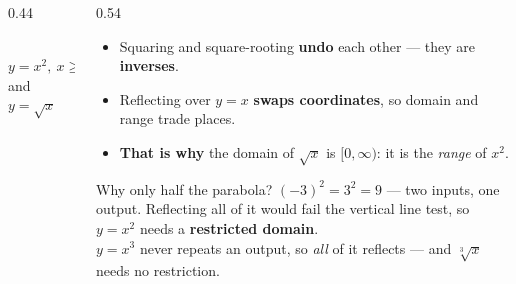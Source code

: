 \documentclass[aspectratio=169, 11pt]{beamer}
\newcommand{\lgrid}[4]{%
  \draw[step=1, linegray!45, thin] (#1,#3) grid (#2,#4);
  \draw[->, thick, charcoal] (#1,0)--(#2,0) node[below right, font=\tiny]{$x$};
  \draw[->, thick, charcoal] (0,#3)--(0,#4) node[left, font=\tiny]{$y$};}
\begin{document}
\begin{frame}[t, plain]
  \begin{columns}[T]
    \begin{column}{0.44\textwidth}
      \centering
      \\[2pt]
      {\footnotesize \textcolor{goldacc}{$y=x^2,\ x\ge0$} \; and \; \textcolor{forest}{$y=\sqrt{x}$}}
    \end{column}
    \begin{column}{0.54\textwidth}
      \begin{itemize}\setlength{\itemsep}{4pt}
        \item Squaring and square-rooting \textbf{undo} each other --- they are \textbf{inverses}.
        \item Reflecting over $y=x$ \textbf{swaps coordinates}, so domain and range trade places.
        \item \textbf{That is why} the domain of $\sqrt{x}$ is $[0,\infty)$: it is the \emph{range}
              of $x^2$.
      \end{itemize}
      \vspace{2pt}
      \begin{block}{Why only half the parabola?}
        $(-3)^2=3^2=9$ --- two inputs, one output. Reflecting all of it would fail the vertical line
        test, so $y=x^2$ needs a \textbf{restricted domain}. \\[3pt]
        $y=x^3$ never repeats an output, so \emph{all} of it reflects --- and $\sqrt[3]{x}$ needs no
        restriction.
      \end{block}
    \end{column}
  \end{columns}
\end{frame}
\end{document}
